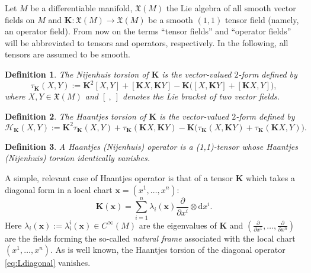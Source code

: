 \documentclass[10pt]{amsart}
\numberwithin{equation}{section}
\newcommand\noi{\noindent}
\newcommand{\rd}{\mathrm{d}}
\newtheorem{definition}{Definition}
\theoremstyle{definition}
\begin{document}
Let $M$ be a differentiable manifold, $\mathfrak{X}(M)$ the Lie algebra of all smooth vector fields on $M$ and $\boldsymbol{K}:\mathfrak{X}(M)\rightarrow \mathfrak{X}(M)$ be a smooth $(1,1)$ tensor field (namely, an operator field).  From now on the terms ``tensor fields'' and ``operator fields'' will be abbreviated to tensors and operators, respectively. In the following, all tensors are assumed to be smooth. 
\begin{definition} \label{def:N}
The
 \textit{Nijenhuis torsion} of $\boldsymbol{K}$ is the vector-valued $2$-form  defined by
\begin{equation} \label{eq:Ntorsion}
\tau_ {\boldsymbol{K}} (X,Y):=\boldsymbol{K}^2[X,Y] +[\boldsymbol{K}X,\boldsymbol{K}Y]-\boldsymbol{K}\Big([X,\boldsymbol{K}Y]+[\boldsymbol{K}X,Y]\Big),
\end{equation}
where $X,Y \in \mathfrak{X}(M)$ and $[ \ , \ ]$ denotes the Lie bracket of two vector fields.
\end{definition}
\begin{definition} \label{def:H}
 \noi The \textit{Haantjes torsion} of $\boldsymbol{K}$ is the vector-valued $2$-form defined by
\begin{equation} \label{eq:Haan}
\mathcal{H}_{\boldsymbol{K}}(X,Y):=\boldsymbol{K}^2\tau_{\boldsymbol{K}}(X,Y)+\tau_{\boldsymbol{K}}(\boldsymbol{K}X,\boldsymbol{K}Y)-\boldsymbol{K}\Big(\tau_{\boldsymbol{K}}(X,\boldsymbol{K}Y)+\tau_{\boldsymbol{K}}(\boldsymbol{K}X,Y)\Big).
\end{equation}
\end{definition}

\begin{definition}
\label{deHaantjes}
A Haantjes (Nijenhuis)   operator is a (1,1)-tensor  whose  Haantjes (Nijenhuis) torsion identically vanishes.
\end{definition}

A simple, relevant case of Haantjes operator is that of a tensor  $\boldsymbol{K}$  which takes a diagonal form in a local chart $\boldsymbol{x}=(x^1,\ldots,x^n)$:
\begin{equation}
\boldsymbol{K}(\boldsymbol{x})=\sum _{i=1}^n \lambda_{i }(\boldsymbol{x}) \frac{\partial}{\partial x^i}\otimes \rd x^i. \label{eq:Ldiagonal}
 \end{equation}
Here $\lambda_{i }(\boldsymbol{x}):=\lambda^{i}_{i}(\boldsymbol{x})\in C^{\infty}(M)$ are the eigenvalues of $\boldsymbol{K}$ and  $\left(\frac{\partial}{\partial x^1},\ldots, \frac{\partial}{\partial x^n}\right) $ are the fields forming the so-called \textit{natural frame} associated with the local chart $(x^{1},\ldots,x^{n})$. As is well known, the Haantjes torsion of the diagonal operator \eqref{eq:Ldiagonal} vanishes. 
\vspace{2mm}
\end{document}
